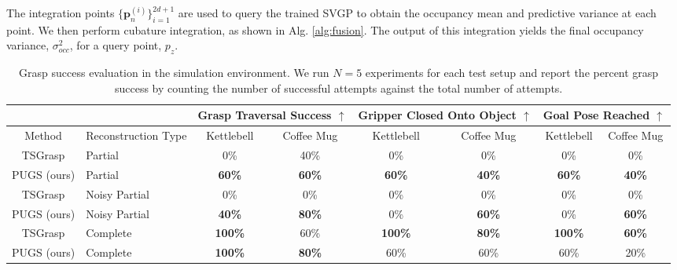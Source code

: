 The integration points $\{\boldsymbol{p}_n^{(i)}\}_{i=1}^{2d+1}$ are used to query the trained SVGP to obtain the occupancy mean and predictive variance at each point.
We then perform cubature integration, as shown in Alg. \ref{alg:fusion}.
The output of this integration yields the final occupancy variance, $\sigma_{occ}^2$, for a query point, $p_z$.
\begin{table*}[b!]
\centering
\caption{Grasp success evaluation in the simulation environment. We run $N=5$ experiments for each test setup and report the percent grasp success by counting the number of successful attempts against the total number of attempts.}
\label{tab:quant_res_counting}
\begin{tabular}{c|l|cc|cc|cc}
 &
   &
  \multicolumn{2}{c|}{Grasp Traversal Success $\uparrow$} &
  \multicolumn{2}{c|}{Gripper Closed Onto Object $\uparrow$} &
  \multicolumn{2}{c}{Goal Pose Reached $\uparrow$} \\ \hline \hline
Method &
  Reconstruction Type &
  Kettlebell &
  Coffee Mug &
  Kettlebell &
  Coffee Mug &
  Kettlebell &
  Coffee Mug \\ \hline
TSGrasp \cite{player_real-time_2023} & Partial & 0\%          & 40\%          & 0\%          & 0\%          & 0\%          & 0\%          \\
PUGS (ours)                          & Partial & \textbf{60\%} & \textbf{60\%} & \textbf{60\%} & \textbf{40\%} & \textbf{60\%} & \textbf{40\%} \\ \hline
TSGrasp \cite{player_real-time_2023} & Noisy Partial            & 0\%          & 0\%          & 0\%          & 0\%          & 0\%          & 0\%          \\
PUGS (ours)                          & Noisy Partial            & \textbf{40\%}          & \textbf{80\%}            & 0\%          & \textbf{60\%}          & 0\%          & \textbf{60\%}          \\ \hline
TSGrasp \cite{player_real-time_2023} & Complete    & \textbf{100\%} & 60\%          & \textbf{100\%} & \textbf{80\%} & \textbf{100\%} & \textbf{60\%} \\
PUGS (ours)                          & Complete    & \textbf{100\%} & \textbf{80\%} & 60\%          & 60\%          & 60\%          & 20\%         
\end{tabular}
\end{table*}

